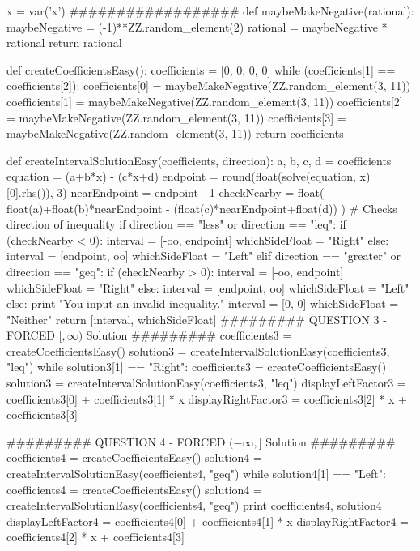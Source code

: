 \documentclass{ximera}
\begin{document}
\begin{sagesilent}
x = var('x')
##################
def maybeMakeNegative(rational):
    maybeNegative = (-1)**ZZ.random_element(2)
    rational = maybeNegative * rational
    return rational

def createCoefficientsEasy():
    coefficients = [0, 0, 0, 0]
    while (coefficients[1] == coefficients[2]):
        coefficients[0] = maybeMakeNegative(ZZ.random_element(3, 11))
        coefficients[1] = maybeMakeNegative(ZZ.random_element(3, 11))
        coefficients[2] = maybeMakeNegative(ZZ.random_element(3, 11))
        coefficients[3] = maybeMakeNegative(ZZ.random_element(3, 11))
    return coefficients

def createIntervalSolutionEasy(coefficients, direction):
    a, b, c, d = coefficients
    equation = (a+b*x) - (c*x+d)
    endpoint = round(float(solve(equation, x)[0].rhs()), 3)
    nearEndpoint = endpoint - 1
    checkNearby = float( float(a)+float(b)*nearEndpoint - (float(c)*nearEndpoint+float(d)) )
    # Checks direction of inequality
    if direction == "less" or direction == "leq":
        if (checkNearby < 0):
            interval = [-oo, endpoint]
            whichSideFloat = "Right"
        else:
            interval = [endpoint, oo]   
            whichSideFloat = "Left"
    elif direction == "greater" or direction == "geq": 
        if (checkNearby > 0):
            interval = [-oo, endpoint]
            whichSideFloat = "Right"
        else:
            interval = [endpoint, oo]
            whichSideFloat = "Left"
    else: 
        print "You input an invalid inequality."
        interval = [0, 0]
        whichSideFloat = "Neither"
    return [interval, whichSideFloat]
######### QUESTION 3 - FORCED $[, \infty)$ Solution #########
coefficients3 = createCoefficientsEasy()
solution3 = createIntervalSolutionEasy(coefficients3, "leq")
while solution3[1] == "Right":
    coefficients3 = createCoefficientsEasy()
    solution3 = createIntervalSolutionEasy(coefficients3, "leq")
displayLeftFactor3 = coefficients3[0] + coefficients3[1] * x
displayRightFactor3 = coefficients3[2] * x + coefficients3[3]

######### QUESTION 4 - FORCED $(-\infty, ]$ Solution #########
coefficients4 = createCoefficientsEasy()
solution4 = createIntervalSolutionEasy(coefficients4, "geq")
while solution4[1] == "Left":
    coefficients4 = createCoefficientsEasy()
    solution4 = createIntervalSolutionEasy(coefficients4, "geq")
    print coefficients4, solution4
displayLeftFactor4 = coefficients4[0] + coefficients4[1] * x
displayRightFactor4 = coefficients4[2] * x + coefficients4[3]


\end{sagesilent}
\end{document}
